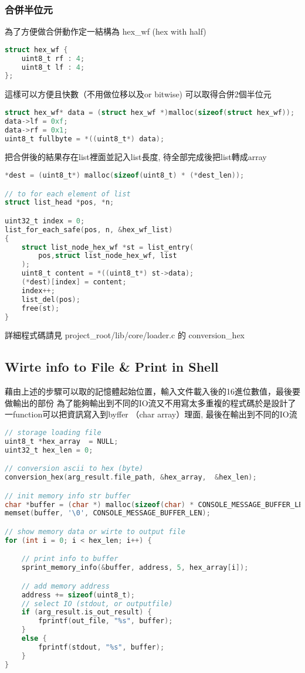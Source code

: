 \documentclass[UTF8,12pt]{article} %
\begin{document}
\subsubsection{合併半位元}

為了方便做合併動作定一結構為 hex\_wf (hex with half)

\begin{lstlisting}[language={C}]
struct hex_wf {
	uint8_t rf : 4;
	uint8_t lf : 4;
};
\end{lstlisting}

這樣可以方便且快數（不用做位移以及or bitwise) 可以取得合併2個半位元

\begin{lstlisting}[language={C}]
struct hex_wf* data = (struct hex_wf *)malloc(sizeof(struct hex_wf));
data->lf = 0xf;
data->rf = 0x1;
uint8_t fullbyte = *((uint8_t*) data);
\end{lstlisting}

把合併後的結果存在list裡面並記入list長度, 待全部完成後把list轉成array
\begin{lstlisting}[language={C}]
*dest = (uint8_t*) malloc(sizeof(uint8_t) * (*dest_len));

// to for each element of list
struct list_head *pos, *n;

uint32_t index = 0;
list_for_each_safe(pos, n, &hex_wf_list)
{
	struct list_node_hex_wf *st = list_entry(
		pos,struct list_node_hex_wf, list
	);
	uint8_t content = *((uint8_t*) st->data);
	(*dest)[index] = content;
	index++;
	list_del(pos);
	free(st);
}
\end{lstlisting}


詳細程式碼請見 project\_root/lib/core/loader.c 的 conversion\_hex
\newpage
\subsection{Wirte info to File \& Print in Shell}

藉由上述的步驟可以取的記憶體起始位置，輸入文件載入後的16進位數值，最後要做輸出的部份
為了能夠輸出到不同的IO流又不用寫太多重複的程式碼於是設計了一function可以把資訊寫入到byffer （char array）理面, 最後在輸出到不同的IO流

\begin{lstlisting}[language={C}]
// storage loading file
uint8_t *hex_array  = NULL;
uint32_t hex_len = 0;

// conversion ascii to hex (byte)
conversion_hex(arg_result.file_path, &hex_array,  &hex_len);

// init memory info str buffer
char *buffer = (char *) malloc(sizeof(char) * CONSOLE_MESSAGE_BUFFER_LEN);
memset(buffer, '\0', CONSOLE_MESSAGE_BUFFER_LEN);

// show memory data or wirte to output file
for (int i = 0; i < hex_len; i++) {

	// print info to buffer
	sprint_memory_info(&buffer, address, 5, hex_array[i]);

	// add memory address
	address += sizeof(uint8_t);
	// select IO (stdout, or outputfile)
	if (arg_result.is_out_result) {
		fprintf(out_file, "%s", buffer);
	}
	else {
		fprintf(stdout, "%s", buffer);
	}
}
\end{lstlisting}
\end{document}
